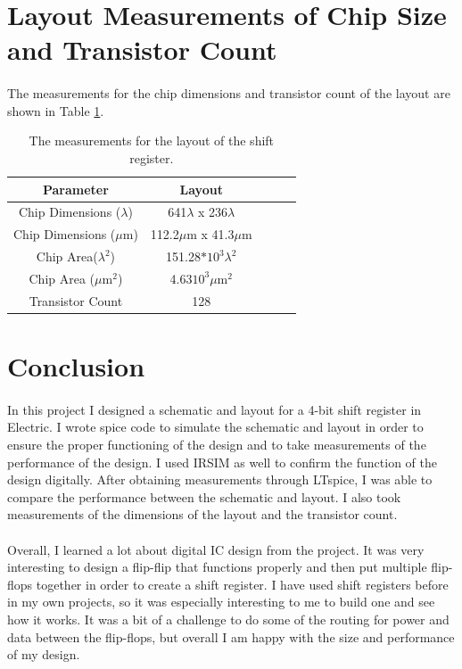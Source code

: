 \documentclass{article}
\begin{document}
\section{Layout Measurements of Chip Size and Transistor Count}
  \paragraph{}
  The measurements for the chip dimensions and transistor count of the layout are shown in Table \ref{table:measurements}.

  \begin{table}[H]
    \centering
    \footnotesize
    \begin{tabular}{|c|c|c|c|c|}
      \hline
      \textbf{Parameter} & \textbf{Layout} \\
      \hline
      Chip Dimensions ($\lambda$) & 641$\lambda$ x 236$\lambda$ \\
      \hline
      Chip Dimensions ($\mu$m) & 112.2$\mu$m x 41.3$\mu$m  \\
      \hline
      Chip Area($\lambda^2$) & 151.28$*10^3\lambda^2$ \\
      \hline
      Chip Area ($\mu$m$^2$) & 4.63$10^3\mu$m$^2$ \\
      \hline
      Transistor Count & 128  \\ 
      \hline
    \end{tabular}
    \caption{The measurements for the layout of the shift register.}
    \label{table:measurements}
  \end{table}


\section{Conclusion}
  \paragraph{}
  In this project I designed a schematic and layout for a 4-bit shift register in Electric. I wrote spice code to simulate the schematic and layout in order to ensure the proper functioning of the design and to take measurements of the performance of the design. I used IRSIM as well to confirm the function of the design digitally. After obtaining measurements through LTspice, I was able to compare the performance between the schematic and layout. I also took measurements of the dimensions of the layout and the transistor count.

  \paragraph{}
  Overall, I learned a lot about digital IC design from the project. It was very interesting to design a flip-flip that functions properly and then put multiple flip-flops together in order to create a shift register. I have used shift registers before in my own projects, so it was especially interesting to me to build one and see how it works. It was a bit of a challenge to do some of the routing for power and data between the flip-flops, but overall I am happy with the size and performance of my design.
\end{document}
